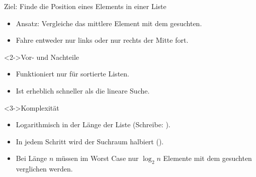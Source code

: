 \begin{frame}
    \begin{block}{Ziel: Finde die Position eines Elements in einer Liste}
        \begin{itemize}
            \item Ansatz: Vergleiche das mittlere Element mit dem gesuchten.
            \item Fahre entweder nur links oder nur rechts der Mitte fort.
        \end{itemize}
    \end{block}
    \begin{block}<2->{Vor- und Nachteile}
        \begin{itemize}
            \item Funktioniert nur für sortierte Listen.
            \item Ist erheblich schneller als die lineare Suche.
        \end{itemize}
    \end{block}
    \begin{block}<3->{Komplexität}
        \begin{itemize}
            \item Logarithmisch in der Länge der Liste (Schreibe: \alert{\olog}).
            \item In jedem Schritt wird der Suchraum halbiert ().
            \item Bei Länge $n$ müssen im Worst Case nur $\log_{2}{n}$ Elemente mit dem gesuchten verglichen werden. 
        \end{itemize}
    \end{block}
\end{frame}
